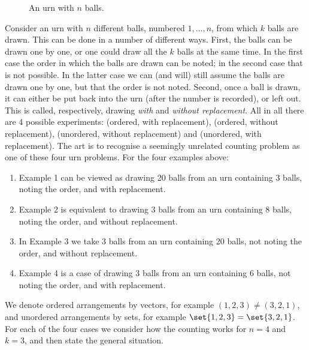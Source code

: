 \begin{figure}[ht]
\centering
{}
\caption{An urn with $n$ balls.}
\label{fig:urn}
\end{figure}

Consider an urn with $n$ different balls, numbered $1, \ldots, n$, from which $k$ balls are drawn. This can be done in a number of different ways. First, the balls can be drawn one by one, or one could draw all the $k$ balls at the same time. In the first case the order in which the balls are drawn can be noted; in the second case that is not possible. In the latter case we can (and will) still assume the balls are drawn one by one, but that the order is not noted. Second, once a ball is drawn, it can either be put back into the urn (after the number is recorded), or left out. This is called, respectively, drawing \emph{with} and \emph{without replacement}. All in all there are 4 possible experiments: (ordered, with replacement), (ordered, without replacement), (unordered, without replacement) and (unordered, with replacement). The art is to recognise a seemingly unrelated counting problem as one of these four urn problems. For the four examples above:
\begin{enumerate}
  \item Example 1 can be viewed as drawing 20 balls from an urn containing 3 balls, noting the order, and with replacement.
  \item Example 2 is equivalent to drawing 3 balls from an urn containing 8 balls, noting the order, and without replacement.
  \item In Example 3 we take 3 balls from an urn containing 20 balls, not noting the order, and without replacement.
  \item Example 4 is a case of drawing 3 balls from an urn containing 6 balls, not noting the order, and with replacement.
\end{enumerate}
We denote ordered arrangements by vectors, for example $(1, 2, 3) \ne (3, 2, 1)$, and unordered arrangements by sets, for example $\set{1, 2, 3} = \set{3, 2, 1}$. For each of the four cases we consider how the counting works for $n = 4$ and $k = 3$, and then state the general situation.

